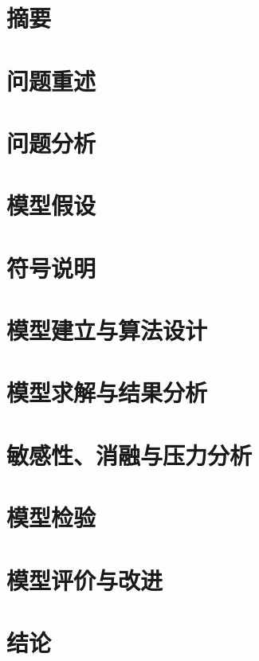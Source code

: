 \documentclass[UTF8,a4paper,12pt]{ctexart}
\begin{document}

\section*{摘要}


\clearpage

\section{问题重述}


\section{问题分析}


\section{模型假设}


\section{符号说明}


\section{模型建立与算法设计}


\section{模型求解与结果分析}


\section{敏感性、消融与压力分析}


\section{模型检验}


\section{模型评价与改进}


\section{结论}


\clearpage
\appendix

\end{document}
